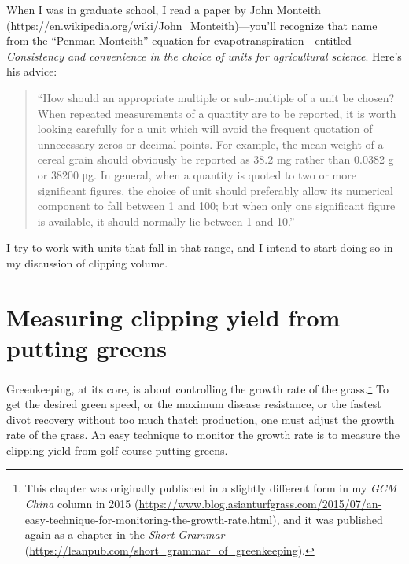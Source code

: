 \documentclass[12pt,b5,]{tufte-book}
\begin{document}
When I was in graduate school, I read a paper \citep{monteith1984} by John Monteith (\url{https://en.wikipedia.org/wiki/John_Monteith})---you'll recognize that name from the ``Penman-Monteith'' equation for evapotranspiration---entitled
\emph{Consistency and convenience in the choice of units for agricultural science}. Here's his advice:

\begin{quote}
``How should an appropriate multiple or sub-multiple of a unit be chosen? When repeated measurements of a quantity are to be reported, it is worth looking carefully for a unit which will avoid the frequent quotation of unnecessary zeros or decimal points. For example, the mean weight of a cereal grain should obviously be reported as 38.2 mg rather than 0.0382 g or 38200 μg. In general, when a quantity is quoted to two or more significant figures, the choice of unit should preferably allow its numerical component to fall between 1 and 100; but when only one significant figure is available, it should normally lie between 1 and 10.''
\end{quote}

I try to work with units that fall in that range, and I intend to start doing so in my discussion of clipping volume.

\hypertarget{measuring-clipping-yield-from-putting-greens}{%
\chapter{Measuring clipping yield from putting greens}\label{measuring-clipping-yield-from-putting-greens}}

Greenkeeping, at its core, is about controlling the growth rate of the grass.\footnote{This chapter was originally published in a slightly different form in my \emph{GCM China} column in 2015 (\url{https://www.blog.asianturfgrass.com/2015/07/an-easy-technique-for-monitoring-the-growth-rate.html}), and it was published again as a chapter in the \emph{Short Grammar} (\url{https://leanpub.com/short_grammar_of_greenkeeping}).} To get the desired green speed, or the maximum disease resistance, or the fastest divot recovery without too much thatch production, one must adjust the growth rate of the grass. An easy technique to monitor the growth rate is to measure the clipping yield from golf course putting greens.
\end{document}
